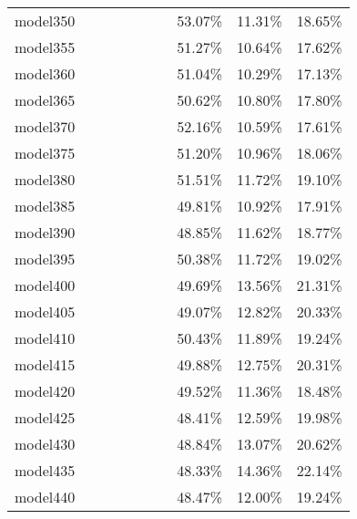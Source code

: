 \begin{longtable}{@{}llllllllll@{}}
model350 &         &         &         &          &         &         & 53.07\%  & 11.31\% & 18.65\% \\
model355 &         &         &         &          &         &         & 51.27\%  & 10.64\% & 17.62\% \\
model360 &         &         &         &          &         &         & 51.04\%  & 10.29\% & 17.13\% \\
model365 &         &         &         &          &         &         & 50.62\%  & 10.80\% & 17.80\% \\
model370 &         &         &         &          &         &         & 52.16\%  & 10.59\% & 17.61\% \\
model375 &         &         &         &          &         &         & 51.20\%  & 10.96\% & 18.06\% \\
model380 &         &         &         &          &         &         & 51.51\%  & 11.72\% & 19.10\% \\
model385 &         &         &         &          &         &         & 49.81\%  & 10.92\% & 17.91\% \\
model390 &         &         &         &          &         &         & 48.85\%  & 11.62\% & 18.77\% \\
model395 &         &         &         &          &         &         & 50.38\%  & 11.72\% & 19.02\% \\
model400 &         &         &         &          &         &         & 49.69\%  & 13.56\% & 21.31\% \\
model405 &         &         &         &          &         &         & 49.07\%  & 12.82\% & 20.33\% \\
model410 &         &         &         &          &         &         & 50.43\%  & 11.89\% & 19.24\% \\
model415 &         &         &         &          &         &         & 49.88\%  & 12.75\% & 20.31\% \\
model420 &         &         &         &          &         &         & 49.52\%  & 11.36\% & 18.48\% \\
model425 &         &         &         &          &         &         & 48.41\%  & 12.59\% & 19.98\% \\
model430 &         &         &         &          &         &         & 48.84\%  & 13.07\% & 20.62\% \\
model435 &         &         &         &          &         &         & 48.33\%  & 14.36\% & 22.14\% \\
model440 &         &         &         &          &         &         & 48.47\%  & 12.00\% & 19.24\% \\

\end{longtable}

